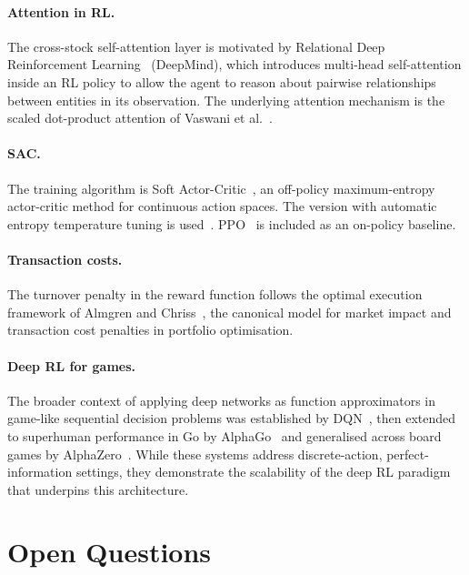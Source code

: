 \documentclass[11pt, a4paper]{article}
\begin{document}
\paragraph{Attention in RL.}
The cross-stock self-attention layer is motivated by Relational Deep
Reinforcement Learning~\cite{zambaldi2018relational} (DeepMind), which
introduces multi-head self-attention inside an RL policy to allow the agent
to reason about pairwise relationships between entities in its observation.
The underlying attention mechanism is the scaled dot-product attention of
Vaswani et al.\ \cite{vaswani2017attention}.

\paragraph{SAC.}
The training algorithm is Soft Actor-Critic~\cite{haarnoja2018sac}, an
off-policy maximum-entropy actor-critic method for continuous action spaces.
The version with automatic entropy temperature tuning is used~\cite{haarnoja2018sacapps}.
PPO~\cite{schulman2017ppo} is included as an on-policy baseline.

\paragraph{Transaction costs.}
The turnover penalty in the reward function follows the optimal execution
framework of Almgren and Chriss~\cite{almgren2001execution}, the canonical
model for market impact and transaction cost penalties in portfolio
optimisation.

\paragraph{Deep RL for games.}
The broader context of applying deep networks as function approximators
in game-like sequential decision problems was established by DQN~\cite{mnih2015dqn},
then extended to superhuman performance in Go by AlphaGo~\cite{silver2016alphago}
and generalised across board games by AlphaZero~\cite{silver2018alphazero}.
While these systems address discrete-action, perfect-information settings,
they demonstrate the scalability of the deep RL paradigm that underpins
this architecture.

\section{Open Questions}
\end{document}
